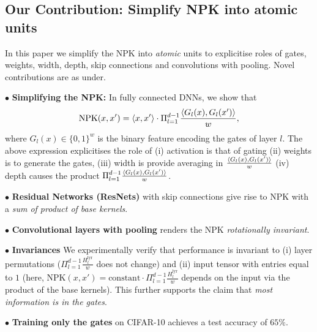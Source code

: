 \subsection{Our Contribution: Simplify NPK into atomic units}
In this paper we simplify the NPK into \emph{atomic} units to explicitise roles of gates, weights, width, depth, skip connections and convolutions with pooling. Novel contributions  are as under.

$\bullet$ \textbf{Simplifying the NPK:} In fully connected DNNs, we show that 
\begin{align*}
\text{NPK}(x,x')=\langle x,x'\rangle\cdot \Pi_{l=1}^{d-1} \frac{\langle G_l(x),G_l(x')\rangle}w, 
 \end{align*}
 where $G_l(x)\in\{0,1\}^w$ is the binary feature encoding the gates of layer $l$. The above expression explicitises the role of (i) activation is that of gating (ii) weights is to generate the gates, (iii) width is provide averaging in $\frac{\langle G_l(x),G_l(x')\rangle}w$ (iv) depth causes the product $\Pi_{l=1}^{d-1} \frac{\langle G_l(x),G_l(x')\rangle}w$. 
 
$\bullet$ \textbf{Residual Networks (ResNets)} with skip connections give rise to NPK with a \emph{ sum of product of base kernels}.

$\bullet$ \textbf{Convolutional layers with pooling} renders the NPK \emph{rotationally invariant}. 

$\bullet$ \textbf{Invariances} We experimentally verify that performance is invariant to (i) layer permutations ($\Pi_{l=1}^{d-1} \frac{H^{\text{lyr}}_l}{w}$ does not change) and (ii) input tensor with entries equal to $1$ (here, NPK$(x,x')= \text{constant}\cdot \Pi_{l=1}^{d-1} \frac{H^{\text{lyr}}_l}{w}$ depends on the input via the product of the base kernels). This further supports the claim that \emph{most information is in the gates}. 

$\bullet$ \textbf{Training only the gates} on CIFAR-10 achieves a test accuracy of $65\%$.


